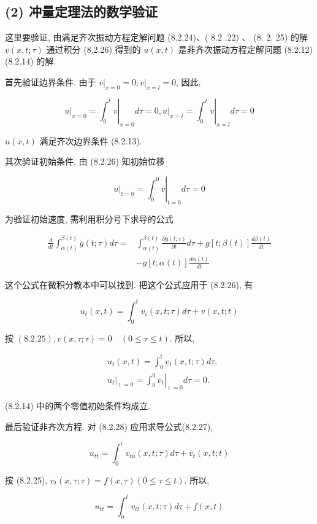 \begin{solution}
\section{(2) 冲量定理法的数学验证}
这里要验证, 由满足齐次振动方程定解问题 (8.2.24)、( 8.2 .22$)$ 、 (8. 2. 25) 的解 $v(x, t ; \tau)$ 通过积分 (8.2.26) 得到的 $u(x, t)$ 是非齐次振动方程定解问题 (8.2.12) (8.2.14) 的解.

首先验证边界条件. 由于 $\left.v\right|_{x=0}=0 ;\left.v\right|_{x=l}=0$, 因此,

$$
\left.u\right|_{x=0}=\left.\int_{0}^{t} v\right|_{x=0} d \tau=0,\left.u\right|_{x=l}=\left.\int_{0}^{t} v\right|_{x=l} d \tau=0
$$

$u(x, t)$ 满足齐次边界条件 (8.2.13).

其次验证初始条件. 由 (8.2.26) 知初始位移

$$
\left.u\right|_{t=0}=\left.\int_{0}^{0} v\right|_{t=0} d \tau=0
$$

为验证初始速度, 需利用积分号下求导的公式

$$
\begin{aligned}
\frac{d}{d t} \int_{\alpha(t)}^{\beta(t)} g(t ; \tau) d \tau= & \int_{\alpha(t)}^{\beta(t)} \frac{\partial g(t ; \tau)}{\partial t} d \tau+g[t ; \beta(t)] \frac{d \beta(t)}{d t} \\
& -g[t ; \alpha(t)] \frac{d \alpha(t)}{d t}
\end{aligned}
$$

这个公式在微积分教本中可以找到. 把这个公式应用于 (8.2.26), 有

$$
u_{t}(x, t)=\int_{0}^{t} v_{\iota}(x, t ; \tau) d \tau+v(x, t ; t)
$$

按 $(8.2 .25), v(x, \tau ; \tau)=0 \quad(0 \leqslant \tau \leqslant t)$. 所以,

$$
\begin{aligned}
& u_{t}(x, t)=\int_{0}^{t} v_{t}(x, t ; \tau) d \tau, \\
& \left.u_{t}\right|_{\imath=0}=\left.\int_{0}^{0} v_{t}\right|_{\imath=0} d \tau=0 .
\end{aligned}
$$

(8.2.14) 中的两个零值初始条件均成立.

最后验证非齐次方程. 对 (8.2.28) 应用求导公式(8.2.27),

$$
u_{t t}=\int_{0}^{t} \dot{v}_{t u}(x, t ; \tau) d \tau+v_{t}(x, t ; t)
$$

按 (8.2.25), $v_{t}(x, \tau ; \tau)=f(x, \tau)(0 \leqslant \tau \leqslant t)$. 所以,

$$
u_{t t}=\int_{0}^{t} v_{t t}(x, t ; \tau) d \tau+f(x, t)
$$


\end{solution}
